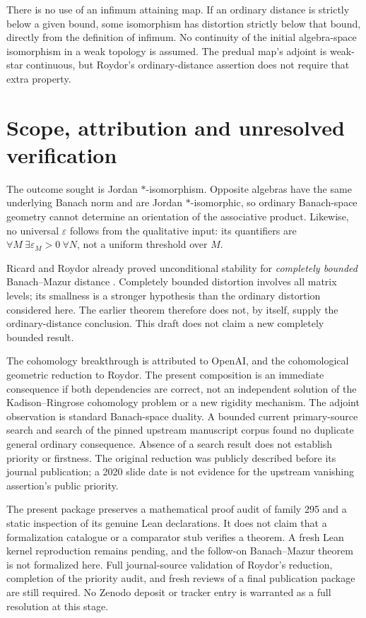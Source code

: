 \documentclass[11pt]{article}
\begin{document}
There is no use of an infimum attaining map. If an ordinary distance
is strictly below a given bound, some isomorphism has distortion
strictly below that bound, directly from the definition of infimum.
No continuity of the initial algebra-space isomorphism in a weak
topology is assumed. The predual map's adjoint is weak-star
continuous, but Roydor's ordinary-distance assertion does not require
that extra property.

\section{Scope, attribution and unresolved verification}

The outcome sought is Jordan $*$-isomorphism. Opposite algebras have
the same underlying Banach norm and are Jordan $*$-isomorphic, so
ordinary Banach-space geometry cannot determine an orientation of the
associative product. Likewise, no universal $\varepsilon$ follows from
the qualitative input: its quantifiers are $\forall M\ \exists
\varepsilon_M>0\ \forall N$, not a uniform threshold over $M$.

Ricard and Roydor already proved unconditional stability for
\emph{completely bounded} Banach--Mazur distance
\cite[Theorem A]{RicardRoydor}. Completely bounded distortion involves
all matrix levels; its smallness is a stronger hypothesis than the
ordinary distortion considered here. The earlier theorem therefore
does not, by itself, supply the ordinary-distance conclusion.
This draft does not claim a new completely bounded result.

The cohomology breakthrough is attributed to OpenAI, and the
cohomological geometric reduction to Roydor. The present composition
is an immediate consequence if both dependencies are correct, not
an independent solution of the Kadison--Ringrose cohomology problem
or a new rigidity mechanism. The adjoint observation is standard
Banach-space duality. A bounded current primary-source search and
search of the pinned upstream manuscript corpus found no duplicate
general ordinary consequence. Absence of a search result does not
establish priority or firstness. The original reduction was publicly
described before its journal publication; a 2020 slide date is not
evidence for the upstream vanishing assertion's public priority.

The present package preserves a mathematical proof audit of family
295 and a static inspection of its genuine Lean declarations. It
does not claim that a formalization catalogue or a comparator stub
verifies a theorem. A fresh Lean kernel reproduction remains pending,
and the follow-on Banach--Mazur theorem is not formalized here.
Full journal-source validation of Roydor's reduction, completion of
the priority audit, and fresh reviews of a final publication package
are still required. No Zenodo deposit or tracker entry is warranted
as a full resolution at this stage.
\end{document}
